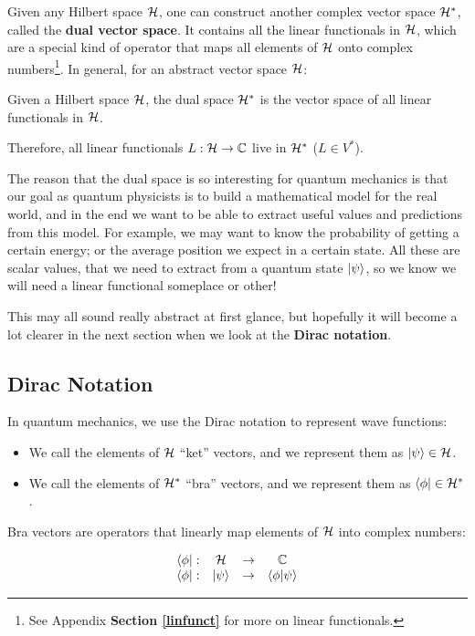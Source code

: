 Given any Hilbert space $\mathcal{H}$, one can construct another complex vector space $\mathcal{H}^*$, called the \textbf{dual vector space}. It contains all the linear functionals in $\mathcal{H}$, which are a special kind of operator that maps all elements of $\mathcal{H}$ onto complex numbers\footnote{See Appendix \textbf{Section \ref{linfunct}} for more on linear functionals.}. In general, for an abstract vector space $\mathcal{H}$:

\begin{definition}
    Given a Hilbert space $\mathcal{H}$, the dual space $\mathcal{H}^*$ is the vector space of all linear functionals in $\mathcal{H}$.
\end{definition}

Therefore, all linear functionals $L: \mathcal{H}\to \mathbb{C}$ live in $\mathcal{H}^*$ ($L\in V^*$).

The reason that the dual space is so interesting for quantum mechanics is that our goal as quantum physicists is to build a mathematical model for the real world, and in the end we want to be able to extract useful values and predictions from this model. For example, we may want to know the probability of getting a certain energy; or the average position we expect in a certain state. All these are scalar values, that we need to extract from a quantum state $|\psi\rangle$, so we know we will need a linear functional someplace or other!

This may all sound really abstract at first glance, but hopefully it will become a lot clearer in the next section when we look at the \textbf{Dirac notation}.

\subsection{Dirac Notation}

In quantum mechanics, we use the Dirac notation to represent wave functions:

\begin{itemize}
    \item We call the elements of $\mathcal{H}$ ``ket'' vectors, and we represent them as $|\psi\rangle\in\mathcal{H}$.
    \item We call the elements of $\mathcal{H}^*$ ``bra'' vectors, and we represent them as $\langle\phi|\in\mathcal{H}^*$.
\end{itemize}

Bra vectors are operators that linearly map elements of $\mathcal{H}$ into complex numbers:

\begin{equation}
    \begin{matrix}
    \langle\phi|: & \mathcal{H} & \rightarrow & \mathbb{C}\\
    \langle\phi|: & |\psi\rangle & \rightarrow & \langle\phi|\psi\rangle\\
    \end{matrix}
\end{equation}

